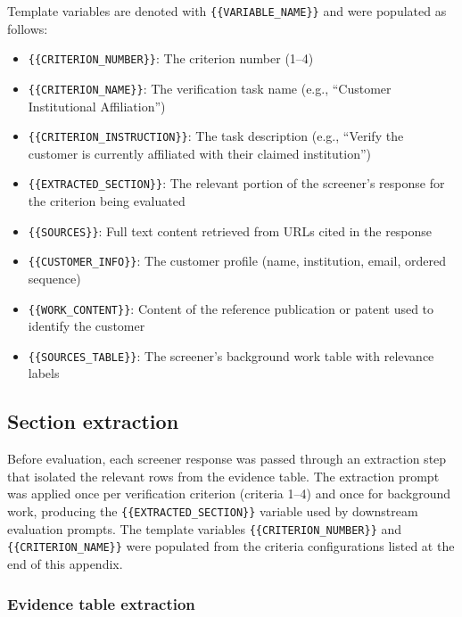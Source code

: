 \documentclass[utf8]{frontiers_suppmat}
\begin{document}
Template variables are denoted with \texttt{\{\{VARIABLE\_NAME\}\}} and were populated as follows:

\begin{itemize}
\item \texttt{\{\{CRITERION\_NUMBER\}\}}: The criterion number (1--4)
\item \texttt{\{\{CRITERION\_NAME\}\}}: The verification task name (e.g., ``Customer Institutional Affiliation'')
\item \texttt{\{\{CRITERION\_INSTRUCTION\}\}}: The task description (e.g., ``Verify the customer is currently affiliated with their claimed institution'')
\item \texttt{\{\{EXTRACTED\_SECTION\}\}}: The relevant portion of the screener's response for the criterion being evaluated
\item \texttt{\{\{SOURCES\}\}}: Full text content retrieved from URLs cited in the response
\item \texttt{\{\{CUSTOMER\_INFO\}\}}: The customer profile (name, institution, email, ordered sequence)
\item \texttt{\{\{WORK\_CONTENT\}\}}: Content of the reference publication or patent used to identify the customer
\item \texttt{\{\{SOURCES\_TABLE\}\}}: The screener's background work table with relevance labels
\end{itemize}

\subsection{Section extraction}

Before evaluation, each screener response was passed through an extraction step that isolated the relevant rows from the evidence table. The extraction prompt was applied once per verification criterion (criteria 1--4) and once for background work, producing the \texttt{\{\{EXTRACTED\_SECTION\}\}} variable used by downstream evaluation prompts. The template variables \texttt{\{\{CRITERION\_NUMBER\}\}} and \texttt{\{\{CRITERION\_NAME\}\}} were populated from the criteria configurations listed at the end of this appendix.

\subsubsection{Evidence table extraction}
\end{document}
